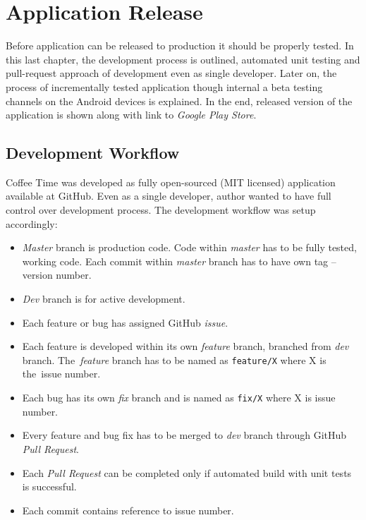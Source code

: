 \chapter{Application Release}
\label{ch:testing}

Before application can be released to production it should be properly tested. In this last chapter, the development process is outlined, automated unit testing and pull-request approach of development even as single developer. Later on, the process of incrementally tested application though internal a beta testing channels on the Android devices is explained. In the end, released version of the application is shown along with link to \textit{Google Play Store}. 

\section{Development Workflow}
Coffee Time was developed as fully open-sourced (MIT licensed) application available at GitHub. Even as a single developer, author wanted to have full control over development process. The development workflow was setup accordingly:

\begin{itemize}
    \item \textit{Master} branch is production code. Code within \textit{master} has to be fully tested, working code. Each commit within \textit{master} branch has to have own tag -- version number.
    \item \textit{Dev} branch is for active development. 
    \item Each feature or bug has assigned GitHub \textit{issue}.  
    \item Each feature is developed within its own \textit{feature} branch, branched from \textit{dev} branch. The~\textit{feature} branch has to be named as \verb|feature/X| where X is the~issue number.
    \item Each bug has its own \textit{fix} branch and is named as \verb|fix/X| where X is issue number.
    \item Every feature and bug fix has to be merged to \textit{dev} branch through GitHub \textit{Pull Request}.
    \item Each \textit{Pull Request} can be completed only if automated build with unit tests is successful.
    \item Each commit contains reference to issue number. 
\end{itemize}

